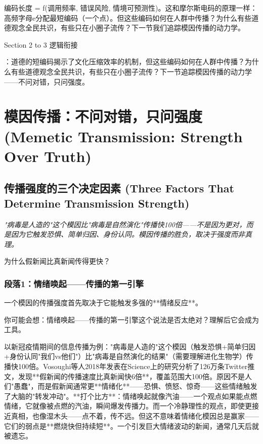 \documentclass[a4paper,12pt]{book}
\newenvironment{motivation}{\begin{tcolorbox}[colback=gray!10,colframe=gray!60,title=\textit{本章动机},fonttitle=\bfseries,arc=0mm,leftrule=3mm]\small\itshape}{\end{tcolorbox}}
\newenvironment{questionbox}{\begin{tcolorbox}[colback=red!3!white,colframe=red!60!black]}{\end{tcolorbox}}
\begin{document}
\begin{motivation}
\begin{motivation}
\begin{motivation}
{编码长度 = f(调用频率, 错误风险, 情境可预测性)。这和摩尔斯电码的原理一样：高频字母e分配最短编码（一个点）。但这些编码如何在人群中传播？为什么有些道德观念全民共识，有些只在小圈子流传？下一节我们追踪模因传播的动力学。


	Section 2 to 3 逻辑衔接}：道德的短编码揭示了文化压缩效率的机制，但这些编码如何在人群中传播？为什么有些道德观念全民共识，有些只在小圈子流传？下一节追踪模因传播的动力学——不问对错，只问强度。

	\section{模因传播：不问对错，只问强度 (Memetic Transmission: Strength Over Truth)}

	\subsection{传播强度的三个决定因素 (Three Factors That Determine Transmission Strength)}
	\begin{motivation}
		"病毒是人造的"这个模因比"病毒是自然演化"传播快100倍——不是因为更对，而是因为它触发恐惧、简单归因、身份认同。模因传播的胜负，取决于强度而非真理。
	\end{motivation}
	\begin{questionbox}
		为什么假新闻比真新闻传得更快？
	\end{questionbox}

	\subsubsection*{段落1：情绪唤起——传播的第一引擎}
	一个模因的传播强度首先取决于它能触发多强的**情绪反应**。
	\begin{tcolorbox}[colback=yellow!5, title=\textit{读者行为预测}]
		你可能会想：情绪唤起——传播的第一引擎这个说法是否太绝对？理解后它会成为工具。
	\end{tcolorbox}

以新冠疫情期间的信息传播为例："病毒是人造的"这个模因（触发恐惧+简单归因+身份认同"我们vs他们"）比"病毒是自然演化的结果"（需要理解进化生物学）传播快100倍。Vosoughi等人2018年发表在Science上的研究分析了126万条Twitter推文，发现**假新闻的传播速度比真新闻快6倍**，覆盖范围大100倍。原因不是人们"愚蠢"，而是假新闻通常更**情绪化**——恐惧、愤怒、惊奇——这些情绪触发了大脑的"转发冲动"。**打个比方**：情绪唤起就像汽油——一个观点如果能点燃情绪，它就像被点燃的汽油，瞬间爆发传播力。而一个冷静理性的观点，即使更接近真相，也像湿木头——点不着，传不远。但这不意味着情绪化模因总是赢家——它们的弱点是**燃烧快但持续短**。一个引发巨大情绪波动的新闻，通常几天后就被遗忘。


\end{motivation}
\end{motivation}
\end{motivation}
\end{document}
